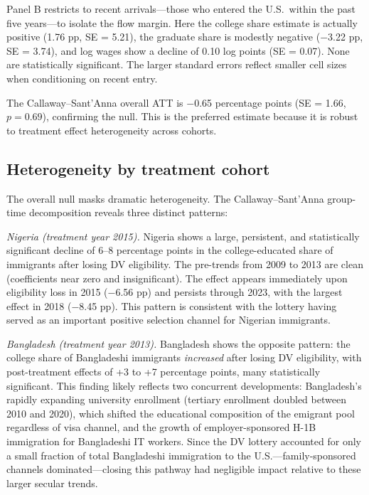 \documentclass[12pt]{article}
\begin{document}
Panel B restricts to recent arrivals---those who entered the U.S.\ within the past five years---to isolate the flow margin. Here the college share estimate is actually positive (1.76 pp, SE = 5.21), the graduate share is modestly negative ($-$3.22 pp, SE = 3.74), and log wages show a decline of 0.10 log points (SE = 0.07). None are statistically significant. The larger standard errors reflect smaller cell sizes when conditioning on recent entry.

The Callaway--Sant'Anna overall ATT is $-$0.65 percentage points (SE = 1.66, $p = 0.69$), confirming the null. This is the preferred estimate because it is robust to treatment effect heterogeneity across cohorts.

\subsection{Heterogeneity by treatment cohort}

The overall null masks dramatic heterogeneity. The Callaway--Sant'Anna group-time decomposition reveals three distinct patterns:

\textit{Nigeria (treatment year 2015).} Nigeria shows a large, persistent, and statistically significant decline of 6--8 percentage points in the college-educated share of immigrants after losing DV eligibility. The pre-trends from 2009 to 2013 are clean (coefficients near zero and insignificant). The effect appears immediately upon eligibility loss in 2015 ($-$6.56 pp) and persists through 2023, with the largest effect in 2018 ($-$8.45 pp). This pattern is consistent with the lottery having served as an important positive selection channel for Nigerian immigrants.

\textit{Bangladesh (treatment year 2013).} Bangladesh shows the opposite pattern: the college share of Bangladeshi immigrants \textit{increased} after losing DV eligibility, with post-treatment effects of +3 to +7 percentage points, many statistically significant. This finding likely reflects two concurrent developments: Bangladesh's rapidly expanding university enrollment (tertiary enrollment doubled between 2010 and 2020), which shifted the educational composition of the emigrant pool regardless of visa channel, and the growth of employer-sponsored H-1B immigration for Bangladeshi IT workers. Since the DV lottery accounted for only a small fraction of total Bangladeshi immigration to the U.S.---family-sponsored channels dominated---closing this pathway had negligible impact relative to these larger secular trends.
\end{document}
